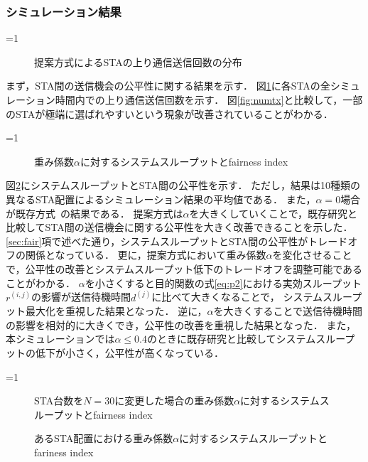 \documentclass[master]{kuisthesis}		%
\newcommand{\sij}{(i,j)}
\newcommand{\rij}{r^{\sij}}
\newcounter{flagFig}
\begin{document}
		\subsubsection{シミュレーション結果}
			\ifnum\value{flagFig}=1 {\begin{figure}[htbp]
				\centering
				\caption{提案方式によるSTAの上り通信送信回数の分布}
				\label{fig:fair}
			\end{figure}}\fi
			まず，STA間の送信機会の公平性に関する結果を示す．
			図\ref{fig:fair}に各STAの全シミュレーション時間内での上り通信送信回数を示す．
			図\ref{fig:numtx}と比較して，一部のSTAが極端に選ばれやすいという現象が改善されていることがわかる．
			\par
			\ifnum\value{flagFig}=1 {\begin{figure}[htbp]
				\centering
				\caption{重み係数$\alpha$に対するシステムスループットとfairness index}
				\label{fig:thr_fair}
			\end{figure}}\fi
			図\ref{fig:thr_fair}にシステムスループットとSTA間の公平性を示す．
			ただし，結果は10種類の異なるSTA配置によるシミュレーション結果の平均値である．
			また，$\alpha=0$場合が既存方式~\cite{promac}の結果である．
			提案方式は$\alpha$を大きくしていくことで，既存研究と比較してSTA間の送信機会に関する公平性を大きく改善できることを示した．
			\ref{sec:fair}項で述べた通り，システムスループットとSTA間の公平性がトレードオフの関係となっている．
			更に，提案方式において重み係数$\alpha$を変化させることで，公平性の改善とシステムスループット低下のトレードオフを調整可能であることがわかる．
			$\alpha$を小さくすると目的関数の式\eqref{eq:p2}における実効スループット$\rij$の影響が送信待機時間$d^{(j)}$に比べて大きくなることで，
			システムスループット最大化を重視した結果となった．
			逆に，$\alpha$を大きくすることで送信待機時間の影響を相対的に大きくでき，公平性の改善を重視した結果となった．
			また，本シミュレーションでは$\alpha\leq0.4$のときに既存研究と比較してシステムスループットの低下が小さく，公平性が高くなっている．
			\par
			\ifnum\value{flagFig}=1 {\begin{figure}[htbp]
				\centering
				\caption{STA台数を$N=30$に変更した場合の重み係数$\alpha$に対するシステムスループットとfairness index}
				\label{fig:chgnum}

				\caption{あるSTA配置における重み係数$\alpha$に対するシステムスループットとfariness index}
				\label{fig:chgtopology}
			\end{figure}}\fi
\end{document}

